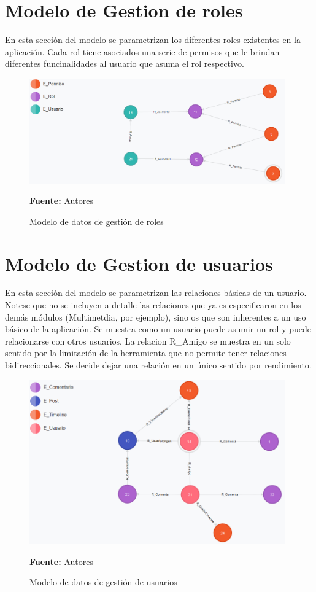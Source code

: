 \section{Modelo de Gestion de roles}

En esta sección del modelo se parametrizan los diferentes roles existentes en la aplicación. Cada rol tiene asociados una serie de permisos que le brindan diferentes funcinalidades al usuario que asuma el rol respectivo.

\begin{figure}[!htb]
  \begin{center}
    \includegraphics[width=11cm]{./imagenes/Modelo_de_datos/Roles.png}
    \caption{Modelo de datos de gestión de roles}
    \label{fig:modelo_datos_gestion_roles}
    \textbf{Fuente:}  Autores
  \end{center}
\end{figure}

\section{Modelo de Gestion de usuarios}

En esta sección del modelo se parametrizan las relaciones básicas de un usuario. Notese que no se incluyen a detalle las relaciones que ya es especificaron en los demás módulos (Multimetdia, por ejemplo), sino os que son inherentes a un uso básico de la aplicación. Se muestra como un usuario puede asumir un rol y puede relacionarse con otros usuarios. La relacion R\_Amigo se muestra en un solo sentido por la limitación de la herramienta que no permite tener relaciones bidireccionales. Se decide dejar una relación en un único sentido por rendimiento.
\begin{figure}[!htb]
  \begin{center}
    \includegraphics[width=11cm]{./imagenes/Modelo_de_datos/Usuarios.png}
    \caption{Modelo de datos de gestión de usuarios}
    \label{fig:modelo_datos_gestion_usuarios}
    \textbf{Fuente:}  Autores
  \end{center}
\end{figure}
